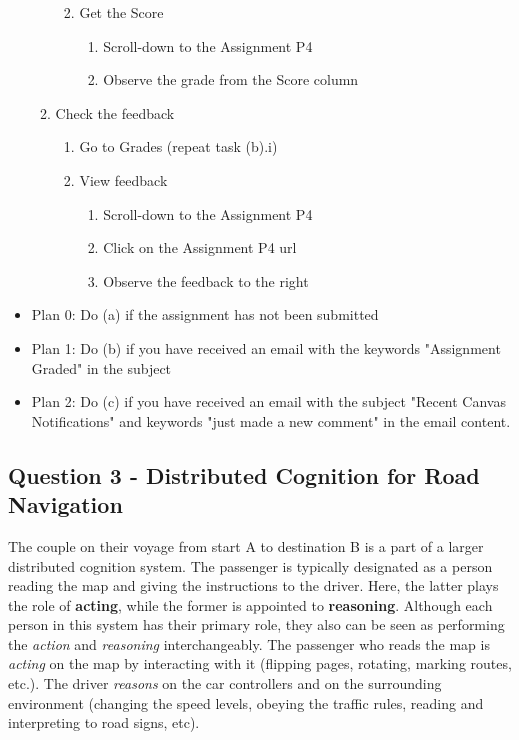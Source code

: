 \documentclass[12pt,letterpaper]{article}
\begin{document}
\begin{enumerate}
\begin{enumerate}
\begin{enumerate}
\begin{enumerate}
                \end{enumerate}
                \item Get the Score
                    \begin{enumerate}
                    \item Scroll-down to the Assignment P4
                    \item Observe the grade from the Score column
                \end{enumerate}
            \end{enumerate}
        \item Check the feedback
            \begin{enumerate}
                \item Go to Grades (repeat task (b).i)
                \item View feedback
                    \begin{enumerate}
                        \item Scroll-down to the Assignment P4
                        \item Click on the Assignment P4 url
                        \item Observe the feedback to the right
                \end{enumerate}
            \end{enumerate}
    \end{enumerate}
\end{enumerate}

\begin{itemize}
    \item Plan 0: Do (a) if the assignment has not been submitted
    \item Plan 1: Do (b) if you have received an email with the keywords "Assignment Graded" in the subject
    \item Plan 2: Do (c) if you have received an email with the subject "Recent Canvas Notifications" and keywords "just made a new comment" in the email content. 
\end{itemize}

\subsection*{Question 3 - Distributed Cognition for Road Navigation}

The couple on their voyage from start A to destination B is a part of a larger distributed cognition system. The passenger is typically designated as a person reading the map and giving the instructions to the driver. Here, the latter plays the role of \textbf{acting}, while the former is appointed to \textbf{reasoning}. Although each person in this system has their primary role, they also can be seen as performing the \textit{action} and \textit{reasoning} interchangeably. The passenger who reads the map is \textit{acting} on the map by interacting with it (flipping pages, rotating, marking routes, etc.). The driver \textit{reasons} on the car controllers and on the surrounding environment (changing the speed levels, obeying the traffic rules, reading and interpreting to road signs, etc). 
\end{document}
